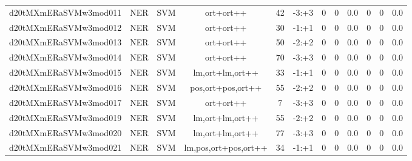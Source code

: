 \documentclass[a4paper]{article}
\begin{document}
\begin{landscape}
\begin{center}
\begin{tabular}{ |c|c|c|c|c|c|c|c|c|c|c|c|}
 
 	
 	\small{ d20tMXmERaSVMw3mod011 } & \small{ NER} & \small{  SVM }  & ort+ort++  &  42 &  \small{  -3:+3 }  &  0 & 0 & 0.0  &  0 & 0 & 0.0 \\
 	

 
 	
 	\small{ d20tMXmERaSVMw3mod012 } & \small{ NER} & \small{  SVM }  & ort+ort++  &  30 &  \small{  -1:+1 }  &  0 & 0 & 0.0  &  0 & 0 & 0.0 \\
 	

 
 	
 	\small{ d20tMXmERaSVMw3mod013 } & \small{ NER} & \small{  SVM }  & ort+ort++  &  50 &  \small{  -2:+2 }  &  0 & 0 & 0.0  &  0 & 0 & 0.0 \\
 	

 
 	
 	\small{ d20tMXmERaSVMw3mod014 } & \small{ NER} & \small{  SVM }  & ort+ort++  &  70 &  \small{  -3:+3 }  &  0 & 0 & 0.0  &  0 & 0 & 0.0 \\
 	

 
 	
 	\small{ d20tMXmERaSVMw3mod015 } & \small{ NER} & \small{  SVM }  & lm,ort+lm,ort++  &  33 &  \small{  -1:+1 }  &  0 & 0 & 0.0  &  0 & 0 & 0.0 \\
 	

 
 	
 	\small{ d20tMXmERaSVMw3mod016 } & \small{ NER} & \small{  SVM }  & pos,ort+pos,ort++  &  55 &  \small{  -2:+2 }  &  0 & 0 & 0.0  &  0 & 0 & 0.0 \\
 	

 
 	
 	\small{ d20tMXmERaSVMw3mod017 } & \small{ NER} & \small{  SVM }  & ort+ort++  &  7 &  \small{  -3:+3 }  &  0 & 0 & 0.0  &  0 & 0 & 0.0 \\
 	

 
 	
 	\small{ d20tMXmERaSVMw3mod019 } & \small{ NER} & \small{  SVM }  & lm,ort+lm,ort++  &  55 &  \small{  -2:+2 }  &  0 & 0 & 0.0  &  0 & 0 & 0.0 \\
 	

 
 	
 	\small{ d20tMXmERaSVMw3mod020 } & \small{ NER} & \small{  SVM }  & lm,ort+lm,ort++  &  77 &  \small{  -3:+3 }  &  0 & 0 & 0.0  &  0 & 0 & 0.0 \\
 	

 
 	
 	\small{ d20tMXmERaSVMw3mod021 } & \small{ NER} & \small{  SVM }  & lm,pos,ort+pos,ort++  &  34 &  \small{  -1:+1 }  &  0 & 0 & 0.0  &  0 & 0 & 0.0 \\
 	


\end{tabular}
\end{center}
\end{landscape}
\end{document}
